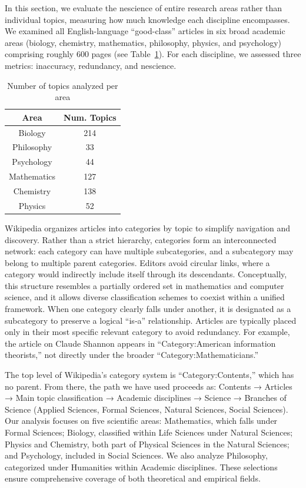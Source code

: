 In this section, we evaluate the nescience of entire research areas rather than individual topics, measuring how much knowledge each discipline encompasses. We examined all English-language “good-class” articles in six broad academic areas (biology, chemistry, mathematics, philosophy, physics, and psychology) comprising roughly 600 pages (see Table \ref{tab:num_topics_per_area}). For each discipline, we assessed three metrics: inaccuracy, redundancy, and nescience.

\begin{table}
\begin{centering}
\begin{tabular}{|c|c|}
\hline 
Area & Num. Topics \tabularnewline
\hline 
\hline
Biology & 214 \tabularnewline
\hline
Philosophy & 33 \tabularnewline
\hline
Psychology & 44 \tabularnewline
\hline
Mathematics & 127 \tabularnewline
\hline
Chemistry & 138 \tabularnewline
\hline
Physics & 52 \tabularnewline
\hline
\end{tabular}
\par\end{centering}
\caption{\label{tab:num_topics_per_area}Number of topics analyzed per area}
\end{table}

Wikipedia organizes articles into categories by topic to simplify navigation and discovery. Rather than a strict hierarchy, categories form an interconnected network: each category can have multiple subcategories, and a subcategory may belong to multiple parent categories. Editors avoid circular links, where a category would indirectly include itself through its descendants. Conceptually, this structure resembles a partially ordered set in mathematics and computer science, and it allows diverse classification schemes to coexist within a unified framework. When one category clearly falls under another, it is designated as a subcategory to preserve a logical “is‑a” relationship. Articles are typically placed only in their most specific relevant category to avoid redundancy. For example, the article on Claude Shannon appears in “Category:American information theorists,” not directly under the broader “Category:Mathematicians.”

The top level of Wikipedia's category system is “Category:Contents,” which has no parent. From there, the path we have used proceeds as: Contents → Articles → Main topic classification → Academic disciplines → Science → Branches of Science (Applied Sciences, Formal Sciences, Natural Sciences, Social Sciences). Our analysis focuses on five scientific areas: Mathematics, which falls under Formal Sciences; Biology, classified within Life Sciences under Natural Sciences; Physics and Chemistry, both part of Physical Sciences in the Natural Sciences; and Psychology, included in Social Sciences. We also analyze Philosophy, categorized under Humanities within Academic disciplines. These selections ensure comprehensive coverage of both theoretical and empirical fields.

